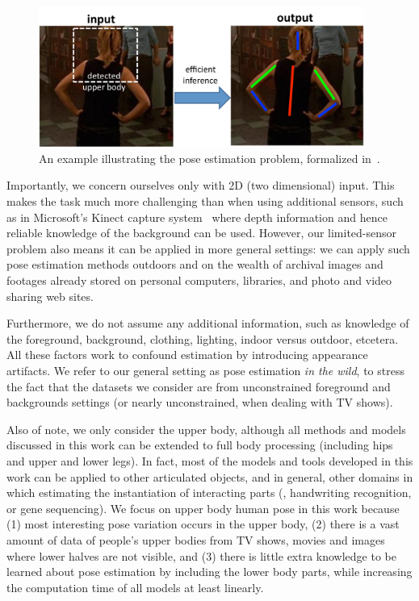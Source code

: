\begin{figure}[tb]
\begin{center}
\includegraphics[width=0.95\textwidth]{figs/problem-statement.pdf}
\caption[Statement of problem.]{An example illustrating the pose estimation 
problem, formalized in~.}
\label{fig:pose-problem}
\end{center}
\end{figure}

Importantly, we concern ourselves only with 2D (two dimensional) input.  This 
makes the task much more challenging than when using additional sensors, such 
as in Microsoft's Kinect capture system~\citep{kinect} where depth information 
and hence reliable knowledge of the background can be used.  However, our 
limited-sensor problem also means it can be applied in more general settings: 
we can apply such pose estimation methods outdoors and on the wealth of 
archival images and footages already stored on personal computers, libraries, 
and photo and video sharing web sites.  

Furthermore, we do not assume any additional information, such as knowledge of 
the foreground, background, clothing, lighting, indoor versus outdoor, 
etcetera.  All these factors work to confound estimation by introducing 
appearance artifacts.  We refer to our general setting as pose estimation {\em 
in the wild}, to stress the fact that the datasets we consider are from 
unconstrained foreground and backgrounds settings (or nearly unconstrained, 
when dealing with TV shows).

Also of note, we only consider the upper body, although all methods and models 
discussed in this work can be extended to full body processing (\ie including 
hips and upper and lower legs).  In fact, most of the models and tools 
developed in this work can be applied to other articulated objects, and in 
general, other domains in which estimating the instantiation of interacting 
parts (\eg, handwriting recognition, or gene sequencing). We focus on upper 
body human pose in this work because (1) most interesting pose variation occurs 
in the upper body, (2) there is a vast amount of data of people's upper bodies 
from TV shows, movies and images where lower halves are not visible, and (3) 
there is little extra knowledge to be learned about pose estimation by 
including the lower body parts, while increasing the computation time of all 
models at least linearly.  

